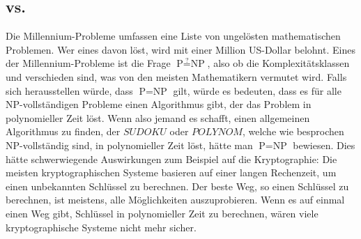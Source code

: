 \subsection{ vs. }
Die Millennium-Probleme umfassen eine Liste von ungelösten mathematischen Problemen.
%
Wer eines davon löst, wird mit einer Million US-Dollar belohnt.
Eines der Millennium-Probleme ist die Frage $\text{P} \stackrel{?}{=} \text{NP}$, also ob die Komplexitätsklassen  und  verschieden sind, was von den meisten Mathematikern vermutet wird.
%
Falls sich herausstellen würde, dass $\text{P} = \text{NP}$ gilt, würde es bedeuten, dass es für alle NP-vollständigen Probleme einen Algorithmus gibt, der das Problem in polynomieller Zeit löst.
Wenn also jemand es schafft, einen allgemeinen Algorithmus zu finden, der $\textit{SUDOKU}$ oder $\textit{POLYNOM}$, welche wie besprochen NP-vollständig sind, in polynomieller Zeit löst, hätte man $\text{P} = \text{NP}$ bewiesen.
Dies hätte schwerwiegende Auswirkungen zum Beispiel auf die Kryptographie:
%
Die meisten kryptographischen Systeme basieren auf einer langen Rechenzeit, um einen unbekannten Schlüssel zu berechnen.
Der beste Weg, so einen Schlüssel zu berechnen, ist meistens, alle Möglichkeiten auszuprobieren.
%
Wenn es auf einmal einen Weg gibt, Schlüssel in polynomieller Zeit zu berechnen, wären viele kryptographische Systeme nicht mehr sicher.
